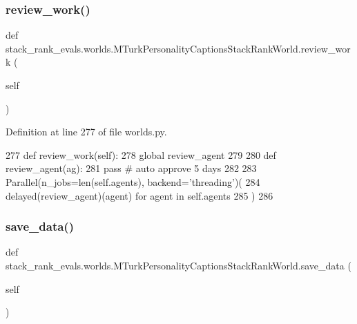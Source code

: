 \subsubsection{\texorpdfstring{review\+\_\+work()}{review\_work()}}
{\footnotesize\ttfamily def stack\+\_\+rank\+\_\+evals.\+worlds.\+M\+Turk\+Personality\+Captions\+Stack\+Rank\+World.\+review\+\_\+work (\begin{DoxyParamCaption}\item[{}]{self }\end{DoxyParamCaption})}



Definition at line 277 of file worlds.\+py.


\begin{DoxyCode}
277     \textcolor{keyword}{def }review\_work(self):
278         \textcolor{keyword}{global} review\_agent
279 
280         \textcolor{keyword}{def }review\_agent(ag):
281             \textcolor{keywordflow}{pass}  \textcolor{comment}{# auto approve 5 days}
282 
283         Parallel(n\_jobs=len(self.agents), backend=\textcolor{stringliteral}{'threading'})(
284             delayed(review\_agent)(agent) \textcolor{keywordflow}{for} agent \textcolor{keywordflow}{in} self.agents
285         )
286 
\end{DoxyCode}
\mbox{\label{classstack__rank__evals_1_1worlds_1_1MTurkPersonalityCaptionsStackRankWorld_a2ee07e4a6c5485756dcec60afe91a430}} 
\subsubsection{\texorpdfstring{save\+\_\+data()}{save\_data()}}
{\footnotesize\ttfamily def stack\+\_\+rank\+\_\+evals.\+worlds.\+M\+Turk\+Personality\+Captions\+Stack\+Rank\+World.\+save\+\_\+data (\begin{DoxyParamCaption}\item[{}]{self }\end{DoxyParamCaption})}



